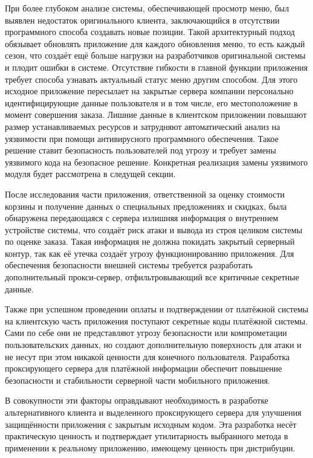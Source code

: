 При более глубоком анализе системы, обеспечивающей просмотр меню, был выявлен недостаток оригинального клиента, заключающийся в отсутствии программного способа создавать новые позиции. Такой архитектурный подход обязывает обновлять приложение для каждого обновления меню, то есть каждый сезон, что создаёт ещё больше нагрузки на разработчиков оригинальной системы и плодит ошибки в системе. Отсутствие гибкости в главной функции приложения требует способа узнавать актуальный статус меню другим способом. Для этого исходное приложение пересылает на закрытые сервера компании персонально идентифицирующие данные пользователя и в том числе, его местоположение в момент совершения заказа. Лишние данные в клиентском приложении повышают размер устанавливаемых ресурсов и затрудняют автоматический анализ на уязвимости при помощи антивирусного программного обеспечения. Такое решение ставит безопасность пользователей под угрозу и требует замены уязвимого кода на безопасное решение. Конкретная реализация замены уязвимого модуля будет рассмотрена в следущей секции.

После исследования части приложения, ответственной за оценку стоимости корзины и получение данных о специальных предложениях и скидках, была обнаружена передающаяся с сервера излишняя информация о внутреннем устройстве системы, что создаёт риск атаки и вывода из строя целиком системы по оценке заказа. Такая информация не должна покидать закрытый серверный контур, так как её утечка создаёт угрозу функционированию приложения. Для обеспечения безопасности внешней системы требуется разработать дополнительный прокси-сервер, отфильтровывающий все критичные секретные данные.

Также при успешном проведении оплаты и подтверждении от платёжной системы на клиентскую часть приложения поступают секретные коды платёжной системы. Сами по себе они не представляют угрозу безопасности или компрометации пользовательских данных, но создают дополнительную поверхность для атаки и не несут при этом никакой ценности для конечного пользователя. Разработка проксирующего сервера для платёжной информации обеспечит повышение безопасности и стабильности серверной части мобильного приложения.

В совокупности эти факторы оправдывают необходимость в разработке альтернативного клиента и выделенного проксирующего сервера для улучшения защищённости приложения с закрытым исходным кодом. Эта разработка несёт практическую ценность и подтверждает утилитарность выбранного метода в применении к реальному приложению, имеющему ценность при дистрибуции.

